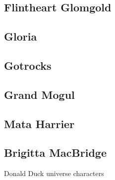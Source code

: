 \documentclass[12pt]{beamer}
\begin{document}
\subsection{Flintheart Glomgold}
\subsection{Gloria}
\subsection{Gotrocks}
\subsection{Grand Mogul}
\subsection{Mata Harrier}
\subsection{Brigitta MacBridge}

\begin{frame}[allowframebreaks]{Donald Duck universe characters}
  \tableofcontents[sections={1-2}]
    \framebreak
  \tableofcontents[sections={3}]
\end{frame}
\end{document}
